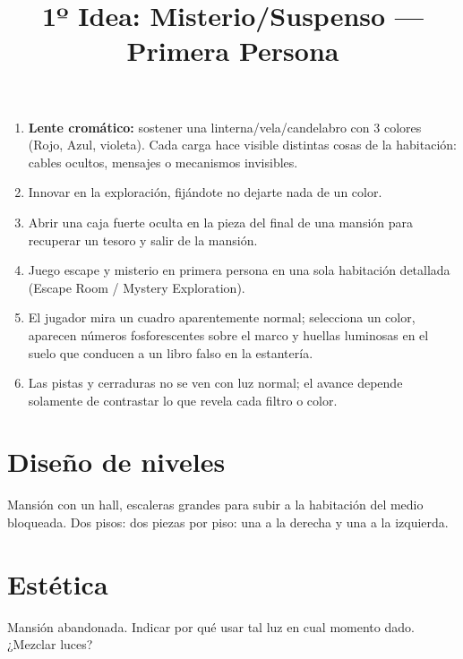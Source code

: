 \documentclass[11pt]{article}
\title{1º Idea: Misterio/Suspenso — Primera Persona}
\author{}
\date{}
\begin{document}
\maketitle

\begin{enumerate}[label=\arabic*)]
    \item \textbf{Lente cromático:} sostener una linterna/vela/candelabro con 3 colores (Rojo, Azul, violeta). Cada carga hace visible distintas cosas de la habitación: cables ocultos, mensajes o mecanismos invisibles.

    \item Innovar en la exploración, fijándote no dejarte nada de un color.

    \item Abrir una caja fuerte oculta en la pieza del final de una mansión para recuperar un tesoro y salir de la mansión.

    \item Juego escape y misterio en primera persona en una sola habitación detallada (Escape Room / Mystery Exploration).

    \item El jugador mira un cuadro aparentemente normal; selecciona un color, aparecen números fosforescentes sobre el marco y huellas luminosas en el suelo que conducen a un libro falso en la estantería.

    \item Las pistas y cerraduras no se ven con luz normal; el avance depende solamente de contrastar lo que revela cada filtro o color.
\end{enumerate}

\section*{Diseño de niveles}
Mansión con un hall, escaleras grandes para subir a la habitación del medio bloqueada. Dos pisos: dos piezas por piso: una a la derecha y una a la izquierda.

\section*{Estética}
Mansión abandonada. Indicar por qué usar tal luz en cual momento dado. ¿Mezclar luces?
\end{document}
